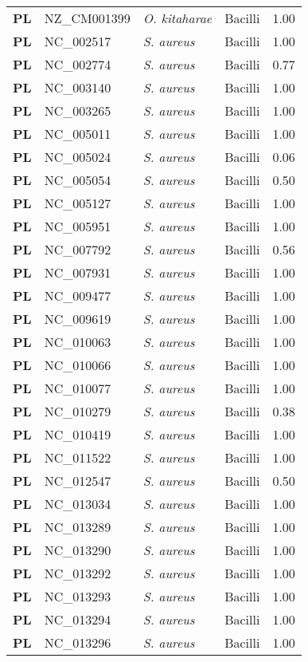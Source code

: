 \begin{adjustwidth}{-3cm}{2cm}
{\begin{supertabular}{>{\bfseries}l|p{0.1\textwidth}p{0.14\textwidth}l|l}
PL & NZ\_CM001399 & \textit{O. kitaharae} & Bacilli & 1.00\\
PL & NC\_002517 & \textit{S. aureus} & Bacilli & 1.00\\
PL & NC\_002774 & \textit{S. aureus} & Bacilli & 0.77\\
PL & NC\_003140 & \textit{S. aureus} & Bacilli & 1.00\\
PL & NC\_003265 & \textit{S. aureus} & Bacilli & 1.00\\
PL & NC\_005011 & \textit{S. aureus} & Bacilli & 1.00\\
PL & NC\_005024 & \textit{S. aureus} & Bacilli & 0.06\\
PL & NC\_005054 & \textit{S. aureus} & Bacilli & 0.50\\
PL & NC\_005127 & \textit{S. aureus} & Bacilli & 1.00\\
PL & NC\_005951 & \textit{S. aureus} & Bacilli & 1.00\\
PL & NC\_007792 & \textit{S. aureus} & Bacilli & 0.56\\
PL & NC\_007931 & \textit{S. aureus} & Bacilli & 1.00\\
PL & NC\_009477 & \textit{S. aureus} & Bacilli & 1.00\\
PL & NC\_009619 & \textit{S. aureus} & Bacilli & 1.00\\
PL & NC\_010063 & \textit{S. aureus} & Bacilli & 1.00\\
PL & NC\_010066 & \textit{S. aureus} & Bacilli & 1.00\\
PL & NC\_010077 & \textit{S. aureus} & Bacilli & 1.00\\
PL & NC\_010279 & \textit{S. aureus} & Bacilli & 0.38\\
PL & NC\_010419 & \textit{S. aureus} & Bacilli & 1.00\\
PL & NC\_011522 & \textit{S. aureus} & Bacilli & 1.00\\
PL & NC\_012547 & \textit{S. aureus} & Bacilli & 0.50\\
PL & NC\_013034 & \textit{S. aureus} & Bacilli & 1.00\\
PL & NC\_013289 & \textit{S. aureus} & Bacilli & 1.00\\
PL & NC\_013290 & \textit{S. aureus} & Bacilli & 1.00\\
PL & NC\_013292 & \textit{S. aureus} & Bacilli & 1.00\\
PL & NC\_013293 & \textit{S. aureus} & Bacilli & 1.00\\
PL & NC\_013294 & \textit{S. aureus} & Bacilli & 1.00\\
PL & NC\_013296 & \textit{S. aureus} & Bacilli & 1.00\\

\end{supertabular}}
\end{adjustwidth}
